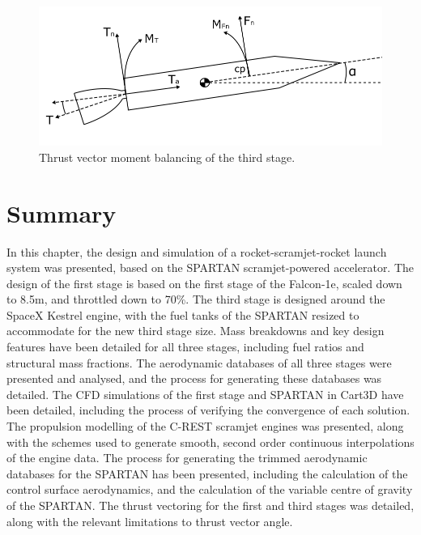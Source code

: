 		
\begin{figure}
\centering
\includegraphics[width=0.7\linewidth]{figures/3_vehicle_design/ThrustVec}
\caption{Thrust vector moment balancing of the third stage.}
\label{fig:ThrustVec}
\end{figure}
		

	\section{Summary}	
	
	In this chapter, the design and simulation of a rocket-scramjet-rocket launch system was presented, based on the SPARTAN scramjet-powered accelerator. 
	The design of the first stage is based on the first stage of the Falcon-1e, scaled down to 8.5m, and throttled down to 70\%. The third stage is designed around the SpaceX Kestrel engine, with the fuel tanks of the SPARTAN resized to accommodate for the new third stage size. 
	 Mass breakdowns and key design features have been detailed for all three stages, including fuel ratios and structural mass fractions.
	 The aerodynamic databases of all three stages were presented and analysed, and the process for generating these databases was detailed. 
	 The CFD simulations of the first stage and SPARTAN in Cart3D have been detailed, including the process of verifying the convergence of each solution. 
	 The propulsion modelling of the C-REST scramjet engines was presented, along with the schemes used to generate smooth, second order continuous interpolations of the engine data. 
	The process for generating the trimmed aerodynamic databases for the SPARTAN has been presented, including the calculation of the control surface aerodynamics, and the calculation of the variable centre of gravity of the SPARTAN. The thrust vectoring for the first and third stages was detailed, along with the relevant limitations to thrust vector angle.
	
	